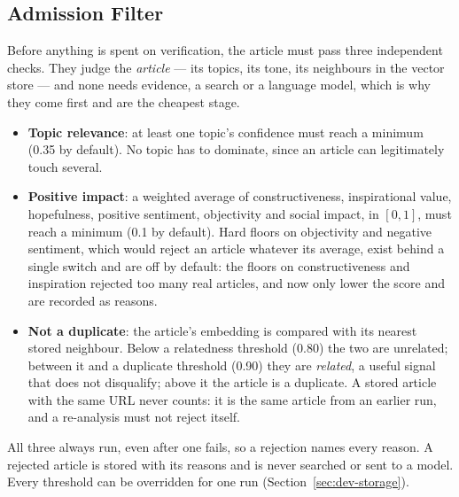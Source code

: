 
\subsection{Admission Filter}
\label{subsec:admission}

Before anything is spent on verification, the article must pass three
independent checks. They judge the \emph{article} --- its topics, its
tone, its neighbours in the vector store --- and none needs evidence, a
search or a language model, which is why they come first and are the
cheapest stage.

\begin{itemize}
    \item \textbf{Topic relevance}: at least one topic's confidence
    must reach a minimum (0.35 by default). No topic has to dominate,
    since an article can legitimately touch several.
    \item \textbf{Positive impact}: a weighted average of
    constructiveness, inspirational value, hopefulness, positive
    sentiment, objectivity and social impact, in $[0,1]$, must reach a
    minimum (0.1 by default). Hard floors on objectivity and negative
    sentiment, which would reject an article whatever its average, exist
    behind a single switch and are off by default: the floors on
    constructiveness and inspiration rejected too many real articles,
    and now only lower the score and are recorded as reasons.
    \item \textbf{Not a duplicate}: the article's embedding is compared
    with its nearest stored neighbour. Below a relatedness threshold
    (0.80) the two are unrelated; between it and a duplicate threshold
    (0.90) they are \emph{related}, a useful signal that does not
    disqualify; above it the article is a duplicate. A stored article
    with the same URL never counts: it is the same article from an
    earlier run, and a re-analysis must not reject itself.
\end{itemize}

All three always run, even after one fails, so a rejection names every
reason. A rejected article is stored with its reasons and is never
searched or sent to a model. Every threshold can be overridden for one
run (Section~\ref{sec:dev-storage}).
